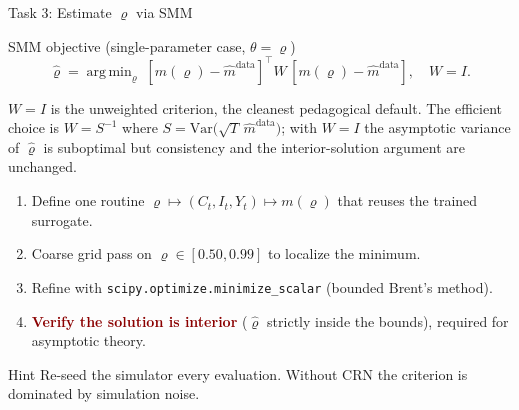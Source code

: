 \documentclass[10pt,aspectratio=169]{beamer}
\newcommand{\emphc}[1]{\textbf{\textcolor{darkred}{#1}}}
\DeclareMathOperator*{\argmin}{arg\,min}
\begin{document}
\begin{frame}{Task 3: Estimate $\varrho$ via SMM}
\scriptsize
\begin{block}{SMM objective (single-parameter case, $\theta = \varrho$)}
\vspace{-4pt}
\[\hat\varrho = \argmin_{\varrho}\; [m(\varrho) - \hat{m}^{\mathrm{data}}]^\top W \,[m(\varrho) - \hat{m}^{\mathrm{data}}], \quad W = I.\]
\vspace{-8pt}

{\scriptsize $W = I$ is the unweighted criterion, the cleanest pedagogical default. The efficient choice is $W = S^{-1}$ where $S = \mathrm{Var}\bigl(\sqrt{T}\,\hat m^{\mathrm{data}}\bigr)$; with $W = I$ the asymptotic variance of $\hat\varrho$ is suboptimal but consistency and the interior-solution argument are unchanged.}
\end{block}
\begin{enumerate}
  \item Define one routine $\varrho \mapsto (C_t, I_t, Y_t) \mapsto m(\varrho)$ that reuses the trained surrogate.
  \item Coarse grid pass on $\varrho \in [0.50, 0.99]$ to localize the minimum.
  \item Refine with \texttt{scipy.optimize.minimize\_scalar} (bounded Brent's method).
  \item \emphc{Verify the solution is interior} ($\hat\varrho$ strictly inside the bounds), required for asymptotic theory.
\end{enumerate}
\begin{alertblock}{Hint}
Re-seed the simulator every evaluation. Without CRN the criterion is dominated by simulation noise.
\end{alertblock}
\end{frame}
\end{document}
